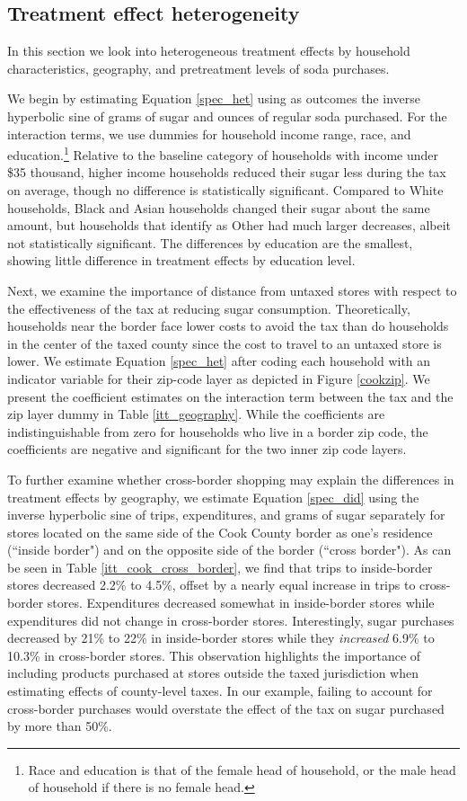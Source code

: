 \documentclass[12pt]{article}
\begin{document}
\subsection{Treatment effect heterogeneity}

In this section we look into heterogeneous treatment effects by household characteristics, geography, and pretreatment levels of soda purchases.

We begin by estimating Equation \ref{spec_het} using as outcomes the inverse hyperbolic sine of grams of sugar and ounces of regular soda purchased. For the interaction terms, we use dummies for household income range, race, and education.\footnote{Race and education is that of the female head of household, or the male head of household if there is no female head.} Relative to the baseline category of households with income under \$35 thousand, higher income households reduced their sugar less during the tax on average, though no difference is statistically significant. Compared to White households, Black and Asian households changed their sugar about the same amount, but households that identify as Other had much larger decreases, albeit not statistically significant. The differences by education are the smallest, showing little difference in treatment effects by education level.

Next, we examine the importance of distance from untaxed stores with respect to the effectiveness of the tax at reducing sugar consumption. Theoretically, households near the border face lower costs to avoid the tax than do households in the center of the taxed county since the cost to travel to an untaxed store is lower. We estimate Equation \ref{spec_het} after coding each household with an indicator variable for their zip-code layer as depicted in Figure \ref{cookzip}. We present the coefficient estimates on the interaction term between the tax and the zip layer dummy in Table \ref{itt_geography}. While the coefficients are indistinguishable from zero for households who live in a border zip code, the coefficients are negative and significant for the two inner zip code layers.

To further examine whether cross-border shopping may explain the differences in treatment effects by geography, we estimate Equation \ref{spec_did} using the inverse hyperbolic sine of trips, expenditures, and grams of sugar separately for stores located on the same side of the Cook County border as one's residence (``inside border") and on the opposite side of the border (``cross border"). As can be seen in Table \ref{itt_cook_cross_border}, we find that trips to inside-border stores decreased 2.2\% to 4.5\%, offset by a nearly equal increase in trips to cross-border stores. Expenditures decreased somewhat in inside-border stores while expenditures did not change in cross-border stores. Interestingly, sugar purchases decreased by 21\% to 22\% in inside-border stores while they \textit{increased} 6.9\% to 10.3\% in cross-border stores. This observation highlights the importance of including products purchased at stores outside the taxed jurisdiction when estimating effects of county-level taxes. In our example, failing to account for cross-border purchases would overstate the effect of the tax on sugar purchased by more than 50\%.
\end{document}
